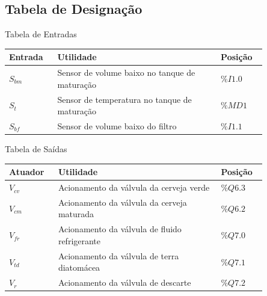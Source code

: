 \documentclass{beamer}
\begin{document}
\subsection{Tabela de Designação}
\begin{frame}
	\begin{block}{Tabela de Entradas}
	\begin{table}[H]
	\centering
	\begin{tabular}{|  p{0.15\linewidth} | p{0.55\linewidth} | p{0.15\linewidth} | }
		\hline
		Entrada & Utilidade & Posição\\
		\hline
		$S_{bm}$ & Sensor de volume baixo no tanque de maturação & $\%I1.0$ \\
		$S_t$ & Sensor de temperatura no tanque de maturação & $\%MD1$ \\
		$S_{bf}$ & Sensor de volume baixo do filtro & $\%I1.1$ \\
		\hline
		\end{tabular}
	\end{table}
	\end{block}
\end{frame}
\begin{frame}
	\begin{block}{Tabela de Saídas}
		\begin{table}[H]
			\centering
			\begin{tabular}{|  p{0.15\linewidth} | p{0.55\linewidth} | p{0.15\linewidth} | }
				\hline
				Atuador & Utilidade & Posição\\
				\hline
				$V_{cv}$ & Acionamento da válvula da cerveja verde & $\%Q6.3$ \\
				$V_{cm}$ & Acionamento da válvula da cerveja maturada & $\%Q6.2$ \\
				$V_{fr}$ & Acionamento da válvula de fluido refrigerante & $\%Q7.0$ \\
				$V_{td}$ & Acionamento da válvula de terra diatomácea & $\%Q7.1$ \\
				$V_r$ & Acionamento da válvula de descarte & $\%Q7.2$ \\
				\hline
			\end{tabular}
		\end{table}
	\end{block}
\end{frame}
\end{document}
